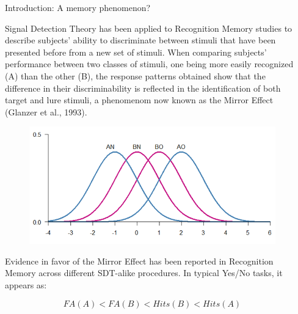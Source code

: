 \documentclass[final]{beamer}
\newlength{\sepwid}
\newlength{\onecolwid}
\begin{document}
\begin{frame}[t]

\begin{columns}[t] %
\begin{column}{\sepwid}\end{column} %
\begin{column}{\onecolwid} %


\begin{alertblock}{Introduction: A memory phenomenon?}

Signal Detection Theory has been applied to Recognition Memory studies to describe subjects’ ability to discriminate between stimuli that have been presented before from a new set of stimuli. When comparing subjects' performance between two classes of stimuli, one being more easily recognized (A) than the other (B), the response patterns obtained show that the difference in their discriminability is reflected in the identification of both target and lure stimuli, a phenomenom now known as the Mirror Effect (Glanzer et al., 1993).


\begin{figure}
\includegraphics[width=0.5\linewidth]{Figures/MirrorEffect.png}
\end{figure}

Evidence in favor of the Mirror Effect has been reported in Recognition Memory across different SDT-alike procedures. In typical Yes/No tasks, it appears as:

\begin{equation}
FA(A) < FA(B) < Hits(B) < Hits(A)
\label{eqn:Rates}
\end{equation}


\end{alertblock}
\end{column}
\end{columns}
\end{frame}
\end{document}
